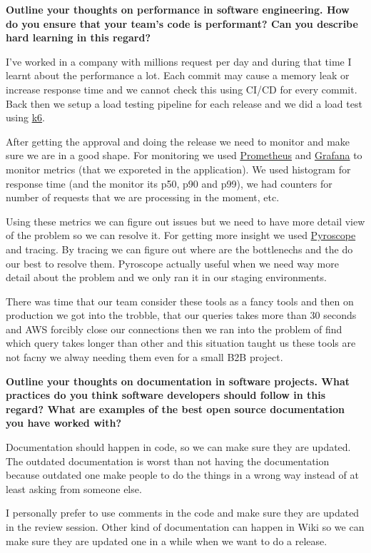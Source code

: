 \noindent
\textbf{Outline your thoughts on performance in software engineering. How do you ensure that your team's code is performant?
Can you describe hard learning in this regard?}

I've worked in a company with millions request per day and during that time I learnt about the performance a lot.
Each commit may cause a memory leak or increase response time and we cannot check this using CI/CD for every commit.
Back then we setup a load testing pipeline for each release and we did a load test using \href{https://github.com/grafana/k6}{k6}.

After getting the approval and doing the release we need to monitor and make sure we are in a good shape.
For monitoring we used \href{https://prometheus.io/}{Prometheus} and \href{https://grafana.com/}{Grafana} to monitor
metrics (that we exporeted in the application). We used histogram for response time (and the monitor its p50, p90 and p99),
we had counters for number of requests that we are processing in the moment, etc.

Using these metrics we can figure out issues but we need to have more detail view of the problem so we can resolve it.
For getting more insight we used \href{https://pyroscope.io/}{Pyroscope} and tracing. By tracing we can figure out where are the bottlenechs
and the do our best to resolve them. Pyroscope actually useful when we need way more detail about the problem
and we only ran it in our staging environments.

There was time that our team consider these tools as a fancy tools and then on production we got into the trobble,
that our queries takes more than 30 seconds and AWS forcibly close our connections then we ran into the problem of
find which query takes longer than other and this situation taught us these tools are not facny we alway needing them
even for a small B2B project.

\noindent
\textbf{Outline your thoughts on documentation in software projects. What practices do you think software developers
should follow in this regard? What are examples of the best open source documentation you have worked with?}

Documentation should happen in code, so we can make sure they are updated. The outdated documentation is worst than
not having the documentation because outdated one make people to do the things in a wrong way instead of at least
asking from someone else.

I personally prefer to use comments in the code and make sure they are updated in the review session. Other kind of
documentation can happen in Wiki so we can make sure they are updated one in a while when we want to do a release.

